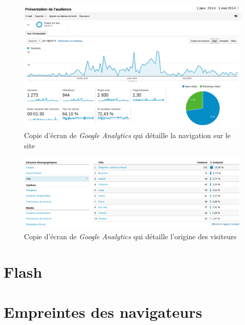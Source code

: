 \begin{figure}[h]
	\centering
	\includegraphics[scale=0.4]{examples/Google_Analytics_1.png}
	\caption{\label{Google_Analytics_1}Copie d'écran de \textit{Google Analytics} qui détaille la navigation sur le site}
\end{figure}

\begin{figure}[h]
	\centering
	\includegraphics[scale=0.4]{examples/Google_Analytics_2.png}
	\caption{\label{Google_Analytics_2}Copie d'écran de \textit{Google Analytics} qui détaille l'origine des visiteurs}
\end{figure}

\section{Flash}



\section{Empreintes des navigateurs}
\label{fingerprinters}
